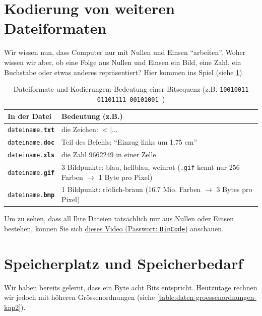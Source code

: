 \section{Kodierung von weiteren Dateiformaten}
Wir wissen nun, dass Computer nur mit Nullen und Einsen \enquote{arbeiten}. Woher wissen wir aber, ob eine Folge aus Nullen und Einsen ein Bild, eine Zahl, ein Buchstabe oder etwas anderes repräsentiert? Hier kommen  ins Spiel (siehe \cref{table:formats-codes}).

\begin{table}[H]
	\centering
	\begin{tabular}{l|p{11cm}}
		\textbf{In der Datei}           & \textbf{Bedeutung (z.B.)}                                                                                 \\\midrule
		\texttt{dateiname.\textbf{txt}} & die Zeichen: $<|\ldots$                                                                                   \\
		\texttt{dateiname.\textbf{doc}} & Teil des Befehls: \enquote{Einzug links um 1.75 cm}                                                       \\
		\texttt{dateiname.\textbf{xls}} & die Zahl 9662249 in einer Zelle                                                                           \\
		\texttt{dateiname.\textbf{gif}} & 3 Bildpunkte: blau, hellblau, weinrot (\texttt{.gif} kennt nur 256 Farben $\rightarrow$ 1 Byte pro Pixel) \\
		\texttt{dateiname.\textbf{bmp}} & 1 Bildpunkt: rötlich-braun (16.7 Mio. Farben $\rightarrow$ 3 Bytes pro Pixel)
	\end{tabular}
	\caption{Dateiformate und Kodierungen: Bedeutung einer Bitsequenz (z.B. \texttt{10010011   01101111   00101001
		})}
	\label{table:formats-codes}
\end{table}

\begin{myremark}
	Um zu sehen, dass all Ihre Dateien tatsächlich nur aus Nullen oder Einsen bestehen, können Sie sich \href{https://cvb.synology.me:5001/d/s/17j56PD0TR1s6D9dFpPiexLX5RNNUTK4/psAJkcIbyyhKXtCqFnxQVzUAr_o8XvVC-FbZAcEBqGQ0}{dieses Video (Passwort: \texttt{BinCode})} anschauen.
\end{myremark}


\section{Speicherplatz und Speicherbedarf}
Wir haben bereits gelernt, dass ein Byte acht Bits entspricht. Heutzutage rechnen wir jedoch mit höheren Grössenordnungen (siehe \cref{table:daten-groessenordnungen-kap2}).

